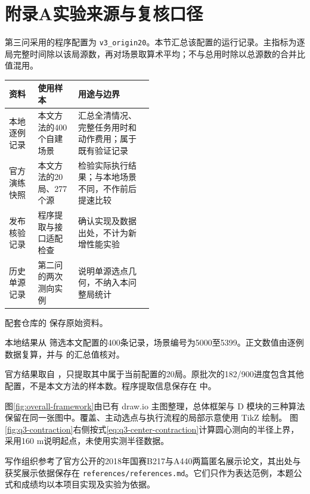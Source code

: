 \section*{附录A\quad 实验来源与复核口径}\label{sec:appendix-evidence}

第三问采用的程序配置为 \texttt{v3\_origin20}。本节汇总该配置的运行记录。主指标为逐局完整时间除以该局源数，再对场景取算术平均；不与总用时除以总源数的合并比值混用。

\begin{center}
\small
{}\label{tab:q23-evidence}
\begin{tabularx}{\linewidth}{@{}p{0.20\linewidth}p{0.28\linewidth}X@{}}
\toprule
资料 & 使用样本 & 用途与边界 \\
\midrule
本地逐例记录 & 本文方法的400个自建场景 & 汇总全清情况、完整任务用时和动作费用；属于既有验证记录 \\
官方演练快照 & 本文方法的20局、277个源 & 检验实际执行结果；与本地场景不同，不作前后提速比较 \\
发布核验记录 & 程序提取与接口适配检查 & 确认实现及数据出处，不计为新增性能实验 \\
历史单源记录 & 第二问的两次测向实例 & 说明单源选点几何，不纳入本问整局统计 \\
\bottomrule
\end{tabularx}
\end{center}

配套仓库的  保存原始资料。

本地结果从  筛选本文配置的400条记录，场景编号为5000至5399。正文数值由逐例数据复算，并与  的汇总值核对。

官方结果取自 ，只提取其中属于当前配置的20局。原批次的182/900进度包含其他配置，不是本文方法的样本数。程序提取信息保存在  中。

图\ref{fig:overall-framework}由已有 draw.io 主图整理，总体框架与 D 模块的三种算法保留在同一张图中。覆盖、主动选点与执行流程的局部示意使用 TikZ 绘制。
图\ref{fig:q3-contraction}右侧按式\eqref{eq:q3-center-contraction}计算圆心测向的半径上界，采用160 m说明起点，未使用实测半径数据。

写作组织参考了官方公开的2018年国赛B217与A440两篇匿名展示论文，其出处与获奖展示依据保存在 \texttt{references/references.md}。它们只作为表达范例，本题公式和成绩均以本项目实现及实验为依据。
